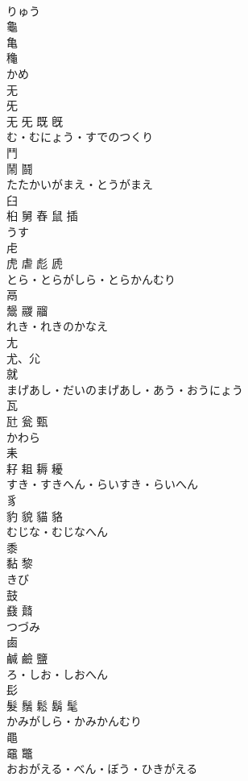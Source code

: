 \documentclass[8pt]{extreport}
\begin{document}
\begin{CJK}{UTF8}{min}
\\	りゅう	
\\	龜	
\\	亀 
\\	龝	
\\	かめ	
\\	无	
\\	旡 
\\	无 旡 既 旣	
\\	む・むにょう・すでのつくり	
\\	鬥	
\\	鬧 鬪	
\\	たたかいがまえ・とうがまえ	
\\	臼	
\\	桕 舅 舂 鼠 插	
\\	うす	
\\	虍	
\\	虎 虐 彪 虒	
\\	とら・とらがしら・とらかんむり	
\\	鬲	
\\	鬶 鬷 鬸	
\\	れき・れきのかなえ	
\\	尢	
\\	尤、尣 
\\	就	
\\	まげあし・だいのまげあし・あう・おうにょう	
\\	瓦	
\\	瓧 瓮 甄	
\\	かわら	
\\	耒	
\\	耔 耝 耨 耰	
\\	すき・すきへん・らいすき・らいへん	
\\	豸	
\\	豹 貌 貓 貉	
\\	むじな・むじなへん	
\\	黍	
\\	黏 黎	
\\	きび	
\\	鼓	
\\	鼗 鼘	
\\	つづみ	
\\	鹵	
\\	鹹 鹼 鹽	
\\	ろ・しお・しおへん	
\\	髟	
\\	髮 鬚 鬆 鬍 髦	
\\	かみがしら・かみかんむり	
\\	黽	
\\	黿 鼈	
\\	おおがえる・べん・ぼう・ひきがえる	

\end{CJK}
\end{document}
